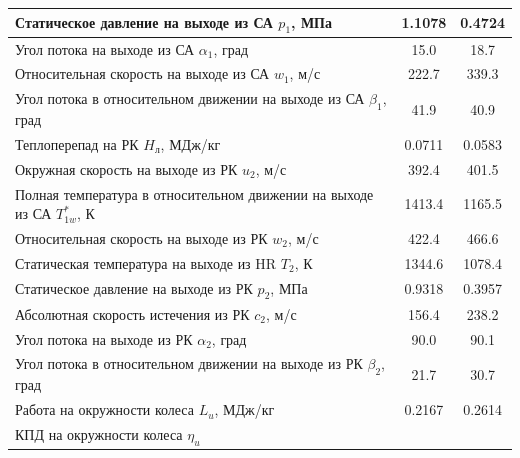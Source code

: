 \documentclass[a4paper,12pt]{article}
\begin{document}
\begin{longtable}{
    |p{8cm}|
%    
    c|
%    
    c|
%    
    }
%        
        \\ \hline
        Статическое давление на выходе из СА $p_1$, МПа
%        
        & 1.1078
%        
        & 0.4724
%        
        \\ \hline
        Угол потока на выходе из СА $\alpha_1$, град
%        
        & 15.0
%        
        & 18.7
%        
        \\ \hline
        Относительная скорость на выходе из СА $w_1$, м/с
%        
        & 222.7
%        
        & 339.3
%        
        \\ \hline
        Угол потока в относительном движении на выходе из СА $\beta_1$, град
%        
        & 41.9
%        
        & 40.9
%        
        \\ \hline
        Теплоперепад на РК $H_л$, МДж/кг
%        
        & 0.0711
%        
        & 0.0583
%        
        \\ \hline
        Окружная скорость на выходе из РК $u_2$, м/с
%        
        & 392.4
%        
        & 401.5
%        
        \\ \hline
        Полная температура в относительном движении на выходе из СА $T_{1w}^*$, К
%        
        & 1413.4
%        
        & 1165.5
%        
        \\ \hline
        Относительная скорость на выходе из РК $w_2$, м/с
%        
        & 422.4
%        
        & 466.6
%        
        \\ \hline
        Статическая температура на выходе из HR $T_2$, К
%        
        & 1344.6
%        
        & 1078.4
%        
        \\ \hline
        Статическое давление на выходе из РК $p_2$, МПа
%        
        & 0.9318
%        
        & 0.3957
%        
        \\ \hline
        Абсолютная скорость истечения из РК $c_2$, м/с
%        
        & 156.4
%        
        & 238.2
%        
        \\ \hline
        Угол потока на выходе из РК $\alpha_2$, град
%        
        & 90.0
%        
        & 90.1
%        
        \\ \hline
        Угол потока в относительном движении на выходе из РК $\beta_2$, град
%        
        & 21.7
%        
        & 30.7
%        
        \\ \hline
        Работа на окружности колеса $L_u$, МДж/кг
%        
        & 0.2167
%        
        & 0.2614
%        
        \\ \hline
        КПД на окружности колеса $\eta_u$

\end{longtable}
\end{document}
